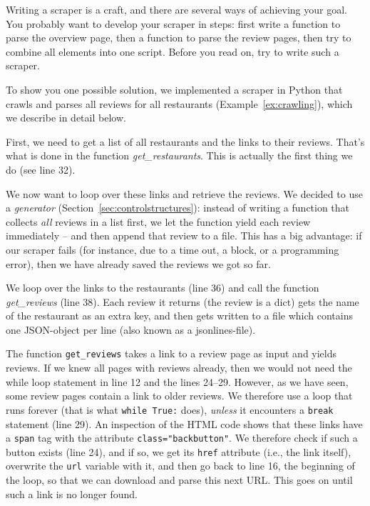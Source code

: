 Writing a scraper is a craft, and there are several ways of achieving your goal.
You probably want to develop your scraper in steps: first write a function to
parse the overview page, then a function to parse the review pages, then try
to combine all elements into one script. Before you read on, try to write
such a scraper.

To show you one possible solution, we implemented a scraper in Python
that crawls and parses all reviews for all restaurants
(Example~\ref{ex:crawling}), which we describe in detail below.


First, we need to get a list of all restaurants and the links to their
reviews. That's what is done in the function \textit{get_restaurants}. This
is actually the first thing we do (see line 32).

We now want to loop over these links and retrieve the reviews.  We
decided to use a \emph{generator} (Section~\ref{sec:controlstructures}): instead of writing a
function that collects \emph{all} reviews in a list first, we let the
function yield each review immediately -- and then append that review
to a file. This has a big advantage: if our scraper fails (for
instance, due to a time out, a block, or a programming error), then we
have already saved the reviews we got so far.

We loop over the links to the restaurants (line 36) and call the
function \textit{get_reviews} (line 38). Each review it returns (the review
is a dict) gets the name of the restaurant as an extra key, and then
gets written to a file which contains one JSON-object per line (also
known as a jsonlines-file).

The function \verb|get_reviews| takes a link to a review page as input and
yields reviews. If we knew all pages with reviews already, then we
would not need the while loop statement in line 12 and the lines
24--29. However, as we have seen, some review pages contain a link to
older reviews. We therefore use a loop that runs forever (that is what
\verb|while True:| does), \emph{unless} it encounters a \verb|break| statement
(line 29).  An inspection of the HTML code shows that these links have
a \verb|span| tag with the attribute \verb|class="backbutton"|. We therefore
check if such a button exists (line 24), and if so, we get its \verb|href|
attribute (i.e., the link itself), overwrite the \verb|url| variable with
it, and then go back to line 16, the beginning of the loop, so that we
can download and parse this next URL.  This goes on until such a
link is no longer found.




